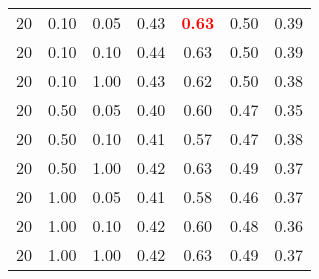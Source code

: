 \begin{tabular}{lllcccc}
20 & 0.10 & 0.05 & 0.43 & \textbf{\textcolor{red}{0.63}} & 0.50 & 0.39 \\ 
20 & 0.10 & 0.10 & 0.44 & 0.63 & 0.50 & 0.39 \\ 
20 & 0.10 & 1.00 & 0.43 & 0.62 & 0.50 & 0.38 \\ 
20 & 0.50 & 0.05 & 0.40 & 0.60 & 0.47 & 0.35 \\ 
20 & 0.50 & 0.10 & 0.41 & 0.57 & 0.47 & 0.38 \\ 
20 & 0.50 & 1.00 & 0.42 & 0.63 & 0.49 & 0.37 \\ 
20 & 1.00 & 0.05 & 0.41 & 0.58 & 0.46 & 0.37 \\ 
20 & 1.00 & 0.10 & 0.42 & 0.60 & 0.48 & 0.36 \\ 
20 & 1.00 & 1.00 & 0.42 & 0.63 & 0.49 & 0.37 \\ 
\end{tabular} 
